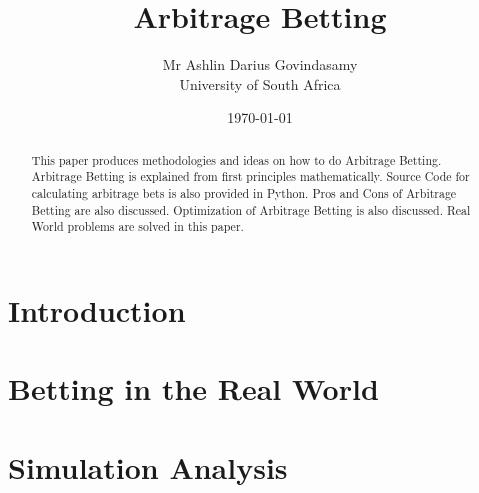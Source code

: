 \documentclass{report}
\title{Arbitrage Betting}
\author{Mr Ashlin Darius Govindasamy\\ \large{University of South Africa}}
\date{\today}
\begin{document}
\maketitle
\newpage
\begin{abstract}
    This paper produces methodologies and ideas on how to do Arbitrage Betting. Arbitrage Betting is explained from first principles mathematically. Source Code for calculating arbitrage bets is also provided in Python. Pros and Cons of Arbitrage Betting are also discussed. Optimization of Arbitrage Betting is also discussed. Real World problems are solved in this paper.
\end{abstract}

\tableofcontents



\chapter{Introduction}


\chapter{Betting in the Real World}


\chapter{Simulation Analysis}


\newpage
\end{document}

